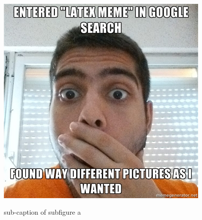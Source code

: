 \documentclass{article}
\begin{document}

\begin{landscape}
\captionsetup{labelsep=newline}
\begin{figure}[h]
    \ffigbox
    {}
    {
    \begin{subfloatrow}[3]
        \ffigbox
        {
         \caption{sub-caption of subfigure a}
         \label{subfig1}
        }
        {\includegraphics[width=\linewidth]{./img/67972605}}
        

\end{subfloatrow}}
\end{figure}
\end{landscape}
\end{document}
